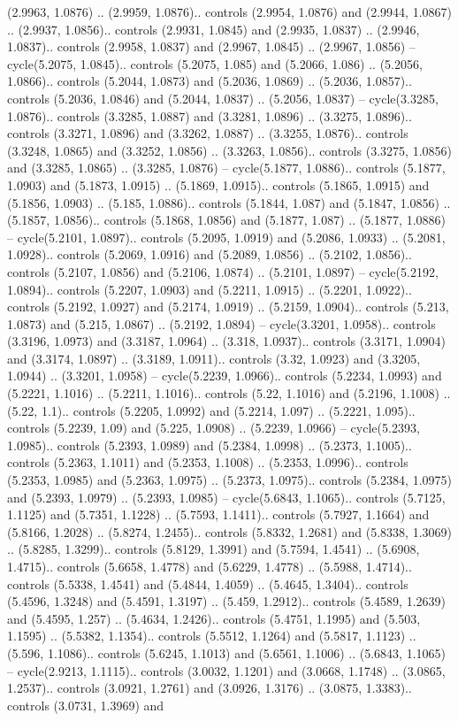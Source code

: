 (2.9963, 1.0876) .. (2.9959, 1.0876).. controls (2.9954, 1.0876) and (2.9944, 1.0867) .. (2.9937, 1.0856).. controls (2.9931, 1.0845) and (2.9935, 1.0837) .. (2.9946, 1.0837).. controls (2.9958, 1.0837) and (2.9967, 1.0845) .. (2.9967, 1.0856) -- cycle(5.2075, 1.0845).. controls (5.2075, 1.085) and (5.2066, 1.086) .. (5.2056, 1.0866).. controls (5.2044, 1.0873) and (5.2036, 1.0869) .. (5.2036, 1.0857).. controls (5.2036, 1.0846) and (5.2044, 1.0837) .. (5.2056, 1.0837) -- cycle(3.3285, 1.0876).. controls (3.3285, 1.0887) and (3.3281, 1.0896) .. (3.3275, 1.0896).. controls (3.3271, 1.0896) and (3.3262, 1.0887) .. (3.3255, 1.0876).. controls (3.3248, 1.0865) and (3.3252, 1.0856) .. (3.3263, 1.0856).. controls (3.3275, 1.0856) and (3.3285, 1.0865) .. (3.3285, 1.0876) -- cycle(5.1877, 1.0886).. controls (5.1877, 1.0903) and (5.1873, 1.0915) .. (5.1869, 1.0915).. controls (5.1865, 1.0915) and (5.1856, 1.0903) .. (5.185, 1.0886).. controls (5.1844, 1.087) and (5.1847, 1.0856) .. (5.1857, 1.0856).. controls (5.1868, 1.0856) and (5.1877, 1.087) .. (5.1877, 1.0886) -- cycle(5.2101, 1.0897).. controls (5.2095, 1.0919) and (5.2086, 1.0933) .. (5.2081, 1.0928).. controls (5.2069, 1.0916) and (5.2089, 1.0856) .. (5.2102, 1.0856).. controls (5.2107, 1.0856) and (5.2106, 1.0874) .. (5.2101, 1.0897) -- cycle(5.2192, 1.0894).. controls (5.2207, 1.0903) and (5.2211, 1.0915) .. (5.2201, 1.0922).. controls (5.2192, 1.0927) and (5.2174, 1.0919) .. (5.2159, 1.0904).. controls (5.213, 1.0873) and (5.215, 1.0867) .. (5.2192, 1.0894) -- cycle(3.3201, 1.0958).. controls (3.3196, 1.0973) and (3.3187, 1.0964) .. (3.318, 1.0937).. controls (3.3171, 1.0904) and (3.3174, 1.0897) .. (3.3189, 1.0911).. controls (3.32, 1.0923) and (3.3205, 1.0944) .. (3.3201, 1.0958) -- cycle(5.2239, 1.0966).. controls (5.2234, 1.0993) and (5.2221, 1.1016) .. (5.2211, 1.1016).. controls (5.22, 1.1016) and (5.2196, 1.1008) .. (5.22, 1.1).. controls (5.2205, 1.0992) and (5.2214, 1.097) .. (5.2221, 1.095).. controls (5.2239, 1.09) and (5.225, 1.0908) .. (5.2239, 1.0966) -- cycle(5.2393, 1.0985).. controls (5.2393, 1.0989) and (5.2384, 1.0998) .. (5.2373, 1.1005).. controls (5.2363, 1.1011) and (5.2353, 1.1008) .. (5.2353, 1.0996).. controls (5.2353, 1.0985) and (5.2363, 1.0975) .. (5.2373, 1.0975).. controls (5.2384, 1.0975) and (5.2393, 1.0979) .. (5.2393, 1.0985) -- cycle(5.6843, 1.1065).. controls (5.7125, 1.1125) and (5.7351, 1.1228) .. (5.7593, 1.1411).. controls (5.7927, 1.1664) and (5.8166, 1.2028) .. (5.8274, 1.2455).. controls (5.8332, 1.2681) and (5.8338, 1.3069) .. (5.8285, 1.3299).. controls (5.8129, 1.3991) and (5.7594, 1.4541) .. (5.6908, 1.4715).. controls (5.6658, 1.4778) and (5.6229, 1.4778) .. (5.5988, 1.4714).. controls (5.5338, 1.4541) and (5.4844, 1.4059) .. (5.4645, 1.3404).. controls (5.4596, 1.3248) and (5.4591, 1.3197) .. (5.459, 1.2912).. controls (5.4589, 1.2639) and (5.4595, 1.257) .. (5.4634, 1.2426).. controls (5.4751, 1.1995) and (5.503, 1.1595) .. (5.5382, 1.1354).. controls (5.5512, 1.1264) and (5.5817, 1.1123) .. (5.596, 1.1086).. controls (5.6245, 1.1013) and (5.6561, 1.1006) .. (5.6843, 1.1065) -- cycle(2.9213, 1.1115).. controls (3.0032, 1.1201) and (3.0668, 1.1748) .. (3.0865, 1.2537).. controls (3.0921, 1.2761) and (3.0926, 1.3176) .. (3.0875, 1.3383).. controls (3.0731, 1.3969) and 